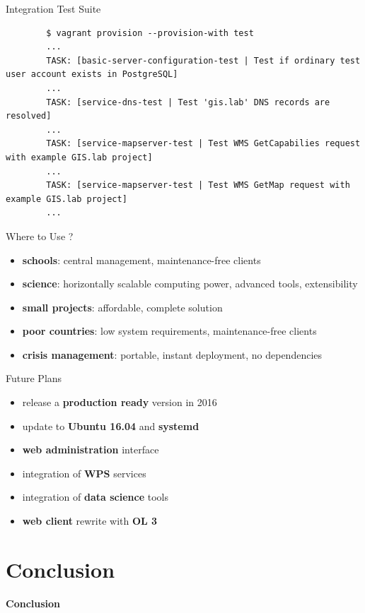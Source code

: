 \documentclass[12pt]{beamer}
\begin{document}
\begin{frame}[fragile]{Integration Test Suite}
	\lstset{language=sh}
	\begin{lstlisting}
		$ vagrant provision --provision-with test
		...
		TASK: [basic-server-configuration-test | Test if ordinary test user account exists in PostgreSQL]
		...
		TASK: [service-dns-test | Test 'gis.lab' DNS records are resolved]
		...
		TASK: [service-mapserver-test | Test WMS GetCapabilies request with example GIS.lab project]
		...
		TASK: [service-mapserver-test | Test WMS GetMap request with example GIS.lab project]
		...
	\end{lstlisting}
\end{frame}

\begin{frame}{Where to Use ?}
	\begin{itemize}
		\item \textbf{schools}: central management, maintenance-free clients
		\item \textbf{science}: horizontally scalable computing power, advanced tools, extensibility
		\item \textbf{small projects}: affordable, complete solution
		\item \textbf{poor countries}: low system requirements, maintenance-free clients
		\item \textbf{crisis management}: portable, instant deployment, no dependencies
	\end{itemize}
\end{frame}

\begin{frame}{Future Plans}
	\begin{itemize}
		\item release a \textbf{production ready} version in 2016
		\item update to \textbf{Ubuntu 16.04} and \textbf{systemd}
		\item \textbf{web administration} interface
		\item integration of \textbf{WPS} services
		\item integration of \textbf{data science} tools
		\item \textbf{web client} rewrite with \textbf{OL 3}
	\end{itemize}
\end{frame}


\section{Conclusion}
\begin{frame}
	\begin{center}
		\LARGE\textbf{Conclusion}
	\end{center}
\end{frame}
\end{document}
